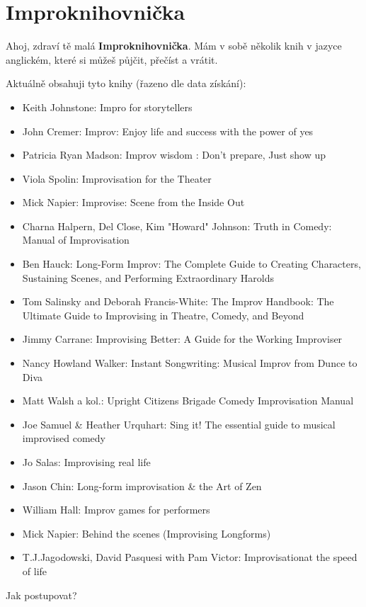 \documentclass[main.tex]{subfiles}
\begin{document}
\needspace{5cm} \section{Improknihovnička} \label{improknihovnička} Ahoj, 
zdraví tě malá \textbf{Improknihovnička}{}. 
Mám v sobě několik knih v jazyce anglickém, které si můžeš půjčit, přečíst a vrátit. 
  
Aktuálně obsahuji tyto knihy (řazeno dle data získání): 
\begin{itemize}
\item Keith Johnstone: Impro for storytellers
\item John Cremer: Improv: Enjoy life and success with the power of yes
\item Patricia Ryan Madson: Improv wisdom : Don't prepare, Just show up
\item Viola Spolin: Improvisation for the Theater
\item Mick Napier: Improvise: Scene from the Inside Out
\item Charna Halpern, Del Close, Kim "Howard"{} Johnson: Truth in Comedy: Manual of Improvisation
\item Ben Hauck: Long-Form Improv: The Complete Guide to Creating Characters, Sustaining Scenes, and Performing Extraordinary Harolds
\item Tom Salinsky and Deborah Francis-White: The Improv Handbook: The Ultimate Guide to Improvising in Theatre, Comedy, and Beyond
\item Jimmy Carrane: Improvising Better: A Guide for the Working Improviser
\item Nancy Howland Walker: Instant Songwriting: Musical Improv from Dunce to Diva
\item Matt Walsh a kol.: Upright Citizens Brigade Comedy Improvisation Manual
\item Joe Samuel & Heather Urquhart: Sing it! The essential guide to musical improvised comedy
\item Jo Salas: Improvising real life
\item Jason Chin: Long-form improvisation & the Art of Zen
\item William Hall: Improv games for performers
\item Mick Napier: Behind the scenes (Improvising Longforms)
\item T.J.Jagodowski, David Pasquesi with Pam Victor: Improvisationat the speed of life
\end{itemize}
 
 
Jak postupovat? 
 
\end{document}
